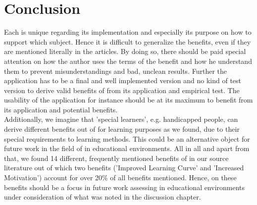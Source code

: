 \section{Conclusion}
Each \AR \app is unique regarding its implementation and especially its purpose on how to support which subject. Hence it is difficult to generalize the benefits, even if they are mentioned literally in the articles.
By doing so, there should be paid special attention on how the author uses the terms of the benefit and how he understand them to prevent misunderstandings and bad, unclean results. Further the application has to be a final 
and well implemented version and no kind of test version to derive valid benefits of \AR from its application and empirical test. The usability of the \AR application for instance should be at its maximum to 
benefit from its application and potential benefits. \\
Additionally, we imagine that 'special learners', e.g. handicapped people, can derive different benefits out of \AR \apps for learning purposes as we found, due to their special requirements to learning methods. This could be an alternative object
for future work in the field of \AR \app in educational environments.
All in all and apart from that, we found 14 different, frequently mentioned benefits of \AR in our source literature out of which two benefits ('Improved Learning Curve' and 'Increased Motivation') account for over 20\% 
of all benefits mentioned. Hence, on these benefits should be a focus in future work assessing \AR \apps in educational environments under consideration of what was noted in the discussion chapter.


